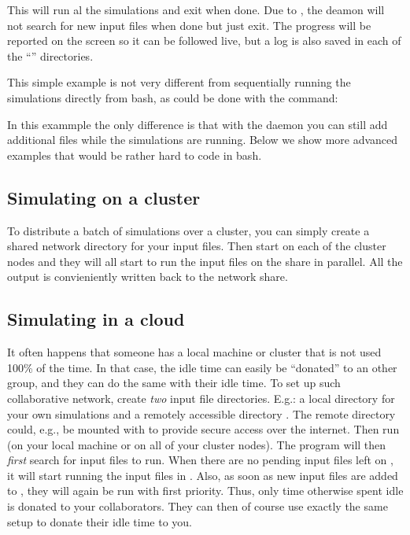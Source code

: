 This will run al the simulations and exit when done. Due to , the deamon will not search for new input files when done but just exit. The progress will be reported on the screen so it can be followed live, but a log is also saved in each of the ``'' directories.

This simple example is not very different from sequentially running the simulations directly from bash, as could be done with the command:


In this exammple the only difference is that with the \mumax daemon you can still add additional files while the simulations are running. Below we show more advanced examples that would be rather hard to code in bash.

\subsection{Simulating on a cluster}

To distribute a batch of simulations over a cluster, you can simply create a shared network directory for your input files. Then start \prog {} \emph{} on each of the cluster nodes
and they will all start to run the input files on the share in parallel. All the output is convieniently written back to the network share.

\subsection{Simulating in a cloud}

It often happens that someone has a local machine or cluster that is not used 100\% of the time. In that case, the idle time can easily be ``donated'' to an other group, and they can do the same with their idle time. To set up such collaborative network, create \emph{two} input file directories. E.g.: a local directory  for your own simulations and a remotely accessible directory . The remote directory could, e.g., be mounted with  to provide secure access over the internet. Then run \prog {} (on your local machine or on all of your cluster nodes). The program will then \emph{first} search  for input files to run. When there are no pending input files left on , it will start running the input files in . Also, as soon as new input files are added to , they will again be run with first priority. Thus, only time otherwise spent idle is donated to your collaborators. They can then of course use exactly the same setup to donate their idle time to you.

